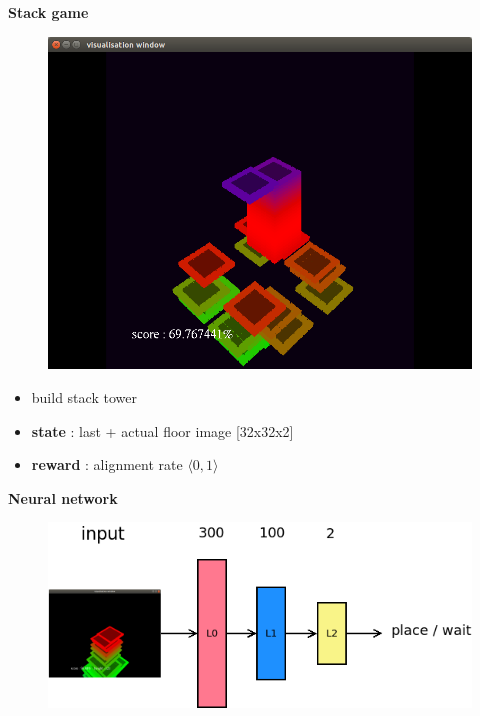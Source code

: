 \documentclass[xcolor=dvipsnames]{beamer}
\begin{document}
\begin{frame}{\bf Stack game}

\begin{minipage}{.5\textwidth}

    \begin{figure}[htbp]
      \centering
      \includegraphics[scale=0.2]{stack_2.png}
    \end{figure}

\end{minipage}%
\begin{minipage}{.5\textwidth}

  \begin{itemize}
   \item build stack tower
   \item {\bf state}  : last + actual floor image [32x32x2]
   \item {\bf reward} : alignment rate $\langle 0, 1 \rangle$
  \end{itemize}

\end{minipage}

\end{frame}



\begin{frame}{\bf Neural network}

\begin{figure}[htbp]
  \centering
  \includegraphics[scale=0.5]{dnn.png}
\end{figure}

\end{frame}
\end{document}
